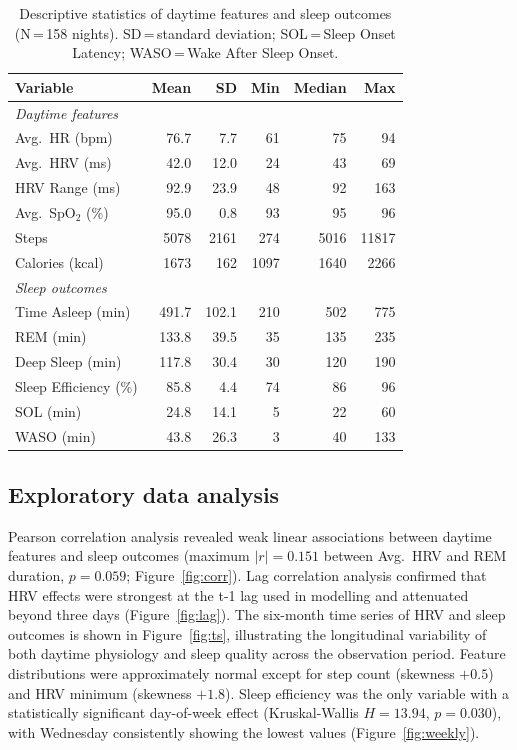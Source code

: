 \documentclass[fleqn,10pt]{wlscirep}
\begin{document}
\begin{table}[htbp]
\caption{Descriptive statistics of daytime features and sleep outcomes (N\,=\,158 nights). SD\,=\,standard deviation; SOL\,=\,Sleep Onset Latency; WASO\,=\,Wake After Sleep Onset.}
\label{tab:descriptive}
\centering
\small
\begin{tabular}{lrrrrr}
\toprule
Variable & Mean & SD & Min & Median & Max \\
\midrule
\multicolumn{6}{l}{\textit{Daytime features}} \\
Avg.\ HR (bpm)        &  76.7 &  7.7 &  61 &  75 &  94 \\
Avg.\ HRV (ms)        &  42.0 & 12.0 &  24 &  43 &  69 \\
HRV Range (ms)        &  92.9 & 23.9 &  48 &  92 & 163 \\
Avg.\ SpO$_2$ (\%)    &  95.0 &  0.8 &  93 &  95 &  96 \\
Steps                 & 5078  & 2161 & 274 &5016 &11817 \\
Calories (kcal)       & 1673  &  162 &1097 &1640 & 2266 \\
\midrule
\multicolumn{6}{l}{\textit{Sleep outcomes}} \\
Time Asleep (min)     & 491.7 & 102.1 & 210 & 502 & 775 \\
REM (min)             & 133.8 &  39.5 &  35 & 135 & 235 \\
Deep Sleep (min)      & 117.8 &  30.4 &  30 & 120 & 190 \\
Sleep Efficiency (\%) &  85.8 &   4.4 &  74 &  86 &  96 \\
SOL (min)             &  24.8 &  14.1 &   5 &  22 &  60 \\
WASO (min)            &  43.8 &  26.3 &   3 &  40 & 133 \\
\bottomrule
\end{tabular}
\end{table}

\subsection*{Exploratory data analysis}
\noindent Pearson correlation analysis revealed weak linear associations between daytime features and sleep outcomes (maximum $|r| = 0.151$ between Avg.\ HRV and REM duration, $p = 0.059$; Figure~\ref{fig:corr}). Lag correlation analysis confirmed that HRV effects were strongest at the t-1 lag used in modelling and attenuated beyond three days (Figure~\ref{fig:lag}). The six-month time series of HRV and sleep outcomes is shown in Figure~\ref{fig:ts}, illustrating the longitudinal variability of both daytime physiology and sleep quality across the observation period. Feature distributions were approximately normal except for step count (skewness $+0.5$) and HRV minimum (skewness $+1.8$). Sleep efficiency was the only variable with a statistically significant day-of-week effect (Kruskal-Wallis $H = 13.94$, $p = 0.030$), with Wednesday consistently showing the lowest values (Figure~\ref{fig:weekly}).
\end{document}

